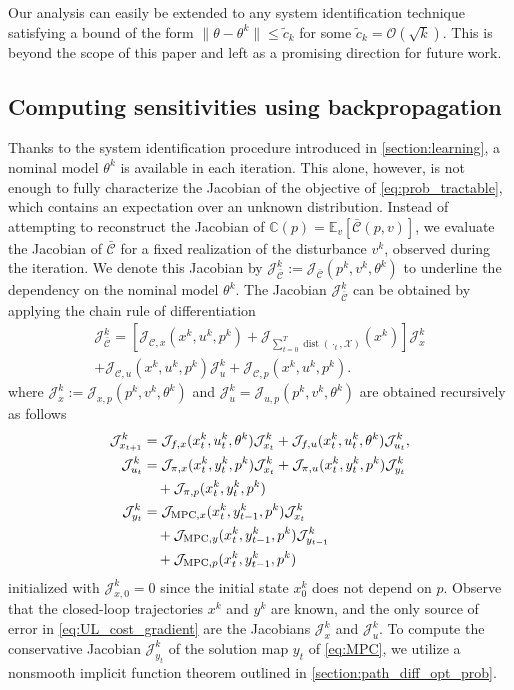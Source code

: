 \documentclass[journal,twoside,web,final]{ieeecolor}
\theoremstyle{definition}
\newcommand{\J}{\mathcal{J}}
\newcommand{\C}{\mathbb{C}}
\begin{document}
Our analysis can easily be extended to any system identification technique satisfying %
a bound of the form $\|\theta-\theta^k\|\leq \tilde{c}_k$ for some $\tilde{c}_k=\mathcal{O}(\sqrt{k})$. 
This is beyond the scope of this paper and left as a promising direction for future work.

\subsection{Computing sensitivities using backpropagation}
\label{section:backprop}
Thanks to the system identification procedure introduced in \cref{section:learning}, 
a nominal model $\theta^k$ is available in each iteration. 
This alone, however, is not enough to fully characterize the Jacobian of the objective of \cref{eq:prob_tractable}, 
which contains an expectation over an unknown distribution. 
Instead of attempting to reconstruct the Jacobian of $\C(p)=\mathbb{E}_v [\bar{\mathcal{C}}(p,v)]$, 
we evaluate the Jacobian of $\bar{\mathcal{C}}$ for a fixed realization of the disturbance $v^k$, observed during the iteration. 
We denote this Jacobian by $\mathcal{J}_{\bar{\mathcal{C}}}^k:=\J_{\bar{\mathcal{C}}}(p^k,v^k,\theta^k)$ to underline the dependency on the nominal model $\theta^k$. 
The Jacobian $\J_{\bar{\mathcal{C}}}^k$ can be obtained by applying the chain rule of differentiation
\begin{multline}
\J_{\bar{\mathcal{C}}}^k = [\mathcal{J}_{\mathcal{C},x}(x^k,u^k,p^k)+\J_{\sum_{t=0}^T\operatorname*{dist}(\cdot_t,\mathcal{X})}(x^k)] \mathcal{J}_x^k \\ + \mathcal{J}_{\mathcal{C},u}(x^k,u^k,p^k) \mathcal{J}_u^k + \mathcal{J}_{\mathcal{C},p}(x^k,u^k,p^k). \label{eq:UL_cost_gradient}
\end{multline}
where $\mathcal{J}_x^k:=\J_{x,p}(p^k,v^k,\theta^k)$ and $\J_u^k=\J_{u,p}(p^k,v^k,\theta^k)$ are obtained recursively as follows
\begin{align}
\J_{x_{t+1}}^k & = \J_{f,x}(x^k_t,u_t^k,\theta^k) \J_{x_t}^k + \J_{f,u}(x^k_t,u_t^k,\theta^k) \J_{u_t}^k, \notag \\
\J_{u_t}^k & = \J_{\pi,x}(x_t^k,y_t^k,p^k) \J_{x_t}^k + \J_{\pi,u}(x_t^k,y_t^k,p^k) \J_{y_t}^k \notag \\ & \quad +\J_{\pi,p}(x_t^k,y_t^k,p^k) \notag \\
\J_{y_t}^k & = \J_{\text{MPC},x}(x_t^k,y_{t-1}^k,p^k)\J_{x_t}^k \notag \\ & \quad + \J_{\text{MPC},y}(x_t^k,y_{t-1}^k,p^k)\J_{y_{t-1}}^k \notag \\ & \quad + \J_{\text{MPC},p}(x_t^k,y_{t-1}^k,p^k) \label{eq:backprop}
\end{align}
initialized with $\J_{x,0}^k=0$ since the initial state $x^k_0$ does not depend on $p$. 
Observe that the closed-loop trajectories $x^k$ and $y^k$ are known, and the only source of error in \cref{eq:UL_cost_gradient} are the Jacobians $\J_x^k$ and $\J_u^k$. 
To compute the conservative Jacobian $\J_{y_t}^k$ of the solution map $y_t$ of \cref{eq:MPC}, we utilize a nonsmooth implicit function theorem outlined in \cref{section:path_diff_opt_prob}.
\end{document}
